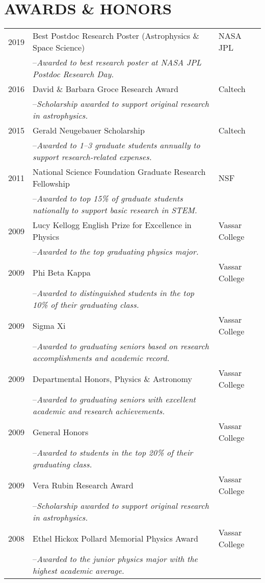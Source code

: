 \section{\large AWARDS \& HONORS}
\begin{tabular}{lll}
2019 & Best Postdoc Research Poster (Astrophysics \& Space Science) & NASA JPL \\
& \quad  --\textit{Awarded to best research poster at NASA JPL Postdoc Research Day.} & \\
2016 & David \& Barbara Groce Research Award & Caltech \\
& \quad --\textit{Scholarship awarded to support original research in astrophysics.} & \\
2015 & Gerald Neugebauer Scholarship & Caltech \\
& \quad --\textit{Awarded to 1--3 graduate students annually to support research-related expenses.} & \\
2011 & National Science Foundation Graduate Research Fellowship & NSF \\
& \quad --\textit{Awarded to top 15\% of graduate students nationally to support basic research in STEM.} & \\
2009 & Lucy Kellogg English Prize for Excellence in Physics & Vassar College \\
& \quad --\textit{Awarded to the top graduating physics major.} \\
2009 & Phi Beta Kappa & Vassar College \\
& \quad --\textit{Awarded to distinguished students in the top 10\% of their graduating class.}\\
2009 & Sigma Xi & Vassar College \\
& \quad --\textit{Awarded to graduating seniors based on research accomplishments and academic record.} \\
2009 & Departmental Honors, Physics \& Astronomy & Vassar College \\
& \quad --\textit{Awarded to graduating seniors with excellent academic and research achievements.} \\
2009 & General Honors & Vassar College \\
& \quad --\textit{Awarded to students in the top 20\% of their graduating class.}\\
2009 & Vera Rubin Research Award & Vassar College \\
& \quad --\textit{Scholarship awarded to support original research in astrophysics.} & \\
2008 & Ethel Hickox Pollard Memorial Physics Award & Vassar College \\
& \quad --\textit{Awarded to the junior physics major with the highest academic average.} & \\
\end{tabular}